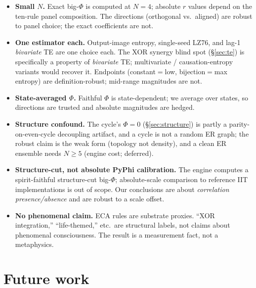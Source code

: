 \documentclass[11pt,a4paper]{article}
\newcommand{\bigphi}{\ensuremath{\Phi}}
\begin{document}
\begin{itemize}\itemsep0.25em
\item \textbf{Small \(N\).} Exact big-\bigphi{} is computed at \(N=4\);
absolute \(r\) values depend on the ten-rule panel composition. The
directions (orthogonal vs.\ aligned) are robust to panel choice; the exact
coefficients are not.
\item \textbf{One estimator each.} Output-image entropy, single-seed LZ76,
and lag-1 \emph{bivariate} TE are one choice each. The XOR synergy blind
spot (\S\ref{sec:te}) is specifically a property of \emph{bivariate} TE;
multivariate / causation-entropy variants would recover it. Endpoints
(constant\(=\)low, bijection\(=\)max entropy) are definition-robust;
mid-range magnitudes are not.
\item \textbf{State-averaged \bigphi{}.} Faithful \bigphi{} is
state-dependent; we average over states, so directions are trusted and
absolute magnitudes are hedged.
\item \textbf{Structure confound.} The cycle's \(\bigphi=0\)
(\S\ref{sec:structure}) is partly a parity-on-even-cycle decoupling
artifact, and a cycle is not a random ER graph; the robust claim is the
weak form (topology not density), and a clean ER ensemble needs
\(N\ge5\) (engine cost; deferred).
\item \textbf{Structure-cut, not absolute PyPhi calibration.} The engine
computes a spirit-faithful structure-cut big-\bigphi{}; absolute-scale
comparison to reference IIT implementations is out of scope. Our
conclusions are about \emph{correlation presence/absence} and are robust
to a scale offset.
\item \textbf{No phenomenal claim.} ECA rules are substrate proxies. ``XOR
integration,'' ``life-themed,'' etc.\ are structural labels, not claims
about phenomenal consciousness. The result is a measurement fact, not a
metaphysics.
\end{itemize}

\section{Future work}
\label{sec:future}
\end{document}
